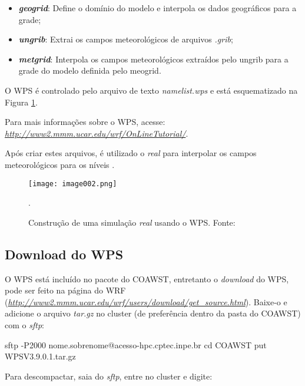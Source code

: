 \begin{itemize}
\item \textbf{\textit{geogrid}}: Define o domínio do modelo e interpola os dados geográficos para a grade;
\item \textbf{\textit{ungrib}}: Extrai os campos meteorológicos de arquivos \textit{.grib};
\item \textbf\textit{{metgrid}}: Interpola os campos meteorológicos extraídos pelo ungrib para a grade do modelo definida pelo meogrid.
\end{itemize}
\bigskip

\noindent O WPS é controlado pelo arquivo de texto \textit{namelist.wps} e está esquematizado na Figura \textcolor{bleu_cite}{\ref{wpsdetalha}}.
\bigskip

\noindent Para mais informações sobre o WPS, acesse:  \textcolor{bleu_cite}{\href{http://www2.mmm.ucar.edu/wrf/OnLineTutorial/}{\textit{http://www2.mmm.ucar.edu/wrf/OnLineTutorial/}}}.
\bigskip

\noindent Após criar estes arquivos, é utilizado o \textit{real} para interpolar os campos meteorológicos para os níveis \texteta.
\bigskip

\begin{figure}[H]
    \centering
    \texttt{[image: image002.png]}
    \caption{Construção de uma simulação \textit{real} usando o WPS. \newline Fonte: \textcite{duda2006}}.
    \label{wpsdetalha}
\end{figure}
\bigskip

\subsection{Download do WPS}
\bigskip

\noindent O WPS está incluído no pacote do COAWST, entretanto o \textit{download} do WPS, pode ser feito na página do WRF (\textcolor{bleu_cite}{\href{http://www2.mmm.ucar.edu/wrf/users/download/get\_source.html}{\textit{http://www2.mmm.ucar.edu/wrf/users/download/get\_source.html}}}). Baixe-o e adicione o arquivo \textit{tar.gz} no cluster (de preferência dentro da pasta do COAWST) com o \textit{sftp}:
\bigskip

\begin{bashcode}
sftp -P2000 nome.sobrenome@acesso-hpc.cptec.inpe.br
cd COAWST
put WPSV3.9.0.1.tar.gz
\end{bashcode}
\bigskip

\noindent Para descompactar, saia do \textit{sftp}, entre no cluster e digite:
\bigskip


